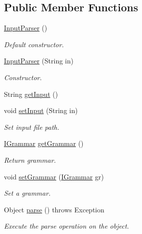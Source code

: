 \subsection*{Public Member Functions}
\begin{DoxyCompactItemize}
\item 
\hypertarget{classinput_parser_1_1_input_parser_aaf865808d98a84af1505caa5a2f61cc4}{\hyperlink{classinput_parser_1_1_input_parser_aaf865808d98a84af1505caa5a2f61cc4}{Input\-Parser} ()}\label{classinput_parser_1_1_input_parser_aaf865808d98a84af1505caa5a2f61cc4}

\begin{DoxyCompactList}\small\item\em Default constructor. \end{DoxyCompactList}\item 
\hyperlink{classinput_parser_1_1_input_parser_a483b176df94134a641628e8856ce994a}{Input\-Parser} (String in)
\begin{DoxyCompactList}\small\item\em Constructor. \end{DoxyCompactList}\item 
String \hyperlink{classinput_parser_1_1_input_parser_aad5d11e151df9b0ede3250d08fc00dfd}{get\-Input} ()
\item 
void \hyperlink{classinput_parser_1_1_input_parser_a9b7d170996964400a619bb3e66253a93}{set\-Input} (String in)
\begin{DoxyCompactList}\small\item\em Set input file path. \end{DoxyCompactList}\item 
\hyperlink{interfacecontext_free_1_1grammar_1_1_i_grammar}{I\-Grammar} \hyperlink{classinput_parser_1_1_input_parser_a48376a4919241160cab692fa0001974f}{get\-Grammar} ()
\begin{DoxyCompactList}\small\item\em Return grammar. \end{DoxyCompactList}\item 
void \hyperlink{classinput_parser_1_1_input_parser_a63e2fa344a4ace430bc7ad7218bc3a37}{set\-Grammar} (\hyperlink{interfacecontext_free_1_1grammar_1_1_i_grammar}{I\-Grammar} gr)
\begin{DoxyCompactList}\small\item\em Set a grammar. \end{DoxyCompactList}\item 
Object \hyperlink{classinput_parser_1_1_input_parser_a08cd69f3dbb1be117c45b4ccf5d861e6}{parse} ()  throws Exception
\begin{DoxyCompactList}\small\item\em Execute the parse operation on the object. \end{DoxyCompactList}\end{DoxyCompactItemize}
